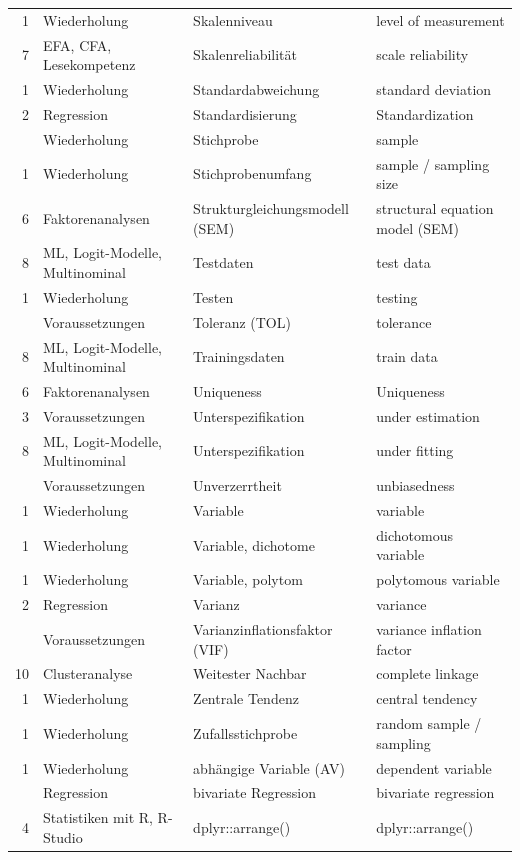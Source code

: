 \documentclass[
  10pt,
  letterpaper,
  a4paper, twoside]{scrreprt}
\begin{document}
\begin{longtable*}{rlll}
1 & Wiederholung & Skalenniveau & level of measurement\\
7 & EFA, CFA, Lesekompetenz & Skalenreliabilität & scale reliability\\
1 & Wiederholung & Standardabweichung & standard deviation\\
2 & Regression & Standardisierung & Standardization\\
 & Wiederholung & Stichprobe & sample\\
1 & Wiederholung & Stichprobenumfang & sample / sampling size\\
6 & Faktorenanalysen & Strukturgleichungsmodell (SEM) & structural equation model (SEM)\\
8 & ML, Logit-Modelle, Multinominal & Testdaten & test data\\
1 & Wiederholung & Testen & testing\\
 & Voraussetzungen & Toleranz (TOL) & tolerance\\
8 & ML, Logit-Modelle, Multinominal & Trainingsdaten & train data\\
6 & Faktorenanalysen & Uniqueness & Uniqueness\\
3 & Voraussetzungen & Unterspezifikation & under estimation\\
8 & ML, Logit-Modelle, Multinominal & Unterspezifikation & under fitting\\
 & Voraussetzungen & Unverzerrtheit & unbiasedness\\
1 & Wiederholung & Variable & variable\\
1 & Wiederholung & Variable, dichotome & dichotomous variable\\
1 & Wiederholung & Variable, polytom & polytomous variable\\
2 & Regression & Varianz & variance\\
 & Voraussetzungen & Varianzinflationsfaktor (VIF) & variance inflation factor\\
10 & Clusteranalyse & Weitester Nachbar & complete linkage\\
1 & Wiederholung & Zentrale Tendenz & central tendency\\
1 & Wiederholung & Zufallsstichprobe & random sample / sampling\\
1 & Wiederholung & abhängige Variable (AV) & dependent variable\\
 & Regression & bivariate Regression & bivariate regression\\
4 & Statistiken mit R, R-Studio & dplyr::arrange() & dplyr::arrange()\\

\end{longtable*}
\end{document}
